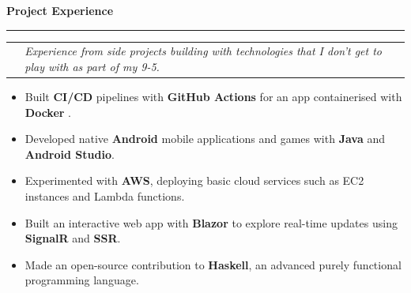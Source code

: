 \documentclass[letterpaper,11pt]{article}
\newcommand{\resheading}[1]{
  {
    \flushleft
    {\Large \textbf{#1}}
    \vspace{-6pt}
    \par\noindent\rule{\textwidth}{0.4pt}
    \vspace{2pt}
  }
}
\begin{document}

  
  




\vspace{4pt}


\resheading{Project Experience}

\vspace{-8pt}

\begin{tabular*}{6.6in}{p{0.2in}p{6.3in}p{0in}}

\, &
  
{\small

     \textit{Experience from side projects building with technologies that I don't get to play with as part of my 9-5.}

     } &
         \, \\

  \end{tabular*}

\vspace{-12pt}
  
{\small
  
  \begin{itemize}
    
    \item Built \textbf{CI/CD} pipelines with \textbf{GitHub Actions} for an app containerised with \textbf{Docker} .
    \item Developed native \textbf{Android} mobile applications and games with \textbf{Java} and \textbf{Android Studio}.
    \item Experimented with \textbf{AWS}, deploying basic cloud services such as EC2 instances and Lambda functions.
    \item Built an interactive web app with \textbf{Blazor} to explore real-time updates using \textbf{SignalR} and \textbf{SSR}.
    \item Made an open-source contribution to \textbf{Haskell}, an advanced purely functional programming language.
      
\end{itemize}

}
\end{document}
